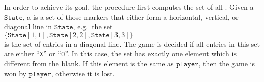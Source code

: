 \begin{enumerate}
      In order to achieve its goal, the procedure first computes the set of all .
      Given a $\mathtt{State}$, a  is a set of those markers that either form a horizontal,
      vertical, or diagonal line in $\mathtt{State}$, e.g.~the set 
      \\[0.2cm]
      \hspace*{1.3cm}
      $\{ \mathtt{State}[1,1], \mathtt{State}[2,2], \mathtt{State}[3,3] \}$
      \\[0.2cm]
      is the set of entries in a diagonal line.  The game is decided if all entries in this set are either
      ``$\mathtt{X}$'' or ``$\mathtt{O}$''.  In this case, the set has exactly one element which is different
      from the blank.  If this element is the same as $\mathtt{player}$, then the game is won by
      $\mathtt{player}$, otherwise it is lost.


\end{enumerate}
